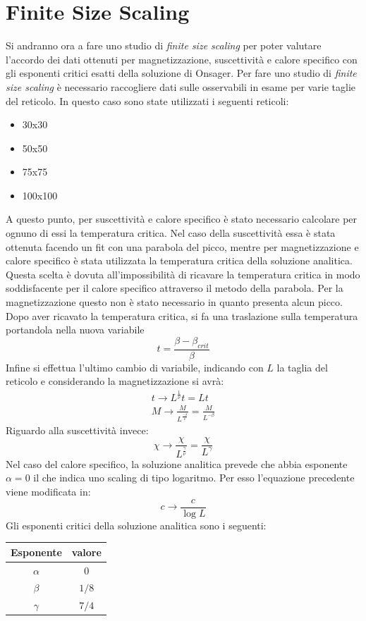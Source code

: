\section{Finite Size Scaling}
Si andranno ora a fare uno studio di \emph{finite size scaling} per poter valutare l'accordo dei dati ottenuti per magnetizzazione, suscettività e calore specifico con gli esponenti critici esatti della soluzione di Onsager.
Per fare uno studio di \emph{finite size scaling} è necessario raccogliere dati sulle osservabili in esame per varie taglie del reticolo. In questo caso sono state utilizzati i seguenti reticoli:
\begin{itemize}
\item 30x30 
\item 50x50 
\item 75x75 
\item 100x100 
\end{itemize}
A questo punto, per suscettività e calore specifico è stato necessario calcolare per ognuno di essi la temperatura critica.
Nel caso della suscettività essa è stata ottenuta facendo un fit con una parabola del picco, mentre per magnetizzazione e calore specifico è stata utilizzata la temperatura critica della soluzione analitica.
Questa scelta è dovuta all'impossibilità di ricavare la temperatura critica in modo soddisfacente per il calore specifico attraverso il metodo della parabola.
Per la magnetizzazione questo non è stato necessario in quanto presenta alcun picco.\\
Dopo aver ricavato la temperatura critica, si fa una traslazione sulla temperatura portandola nella nuova variabile 
$$
	 t = \frac{\beta - \beta_{crit}}{\beta}
$$ 
Infine si effettua l'ultimo cambio di variabile, indicando con $L$ la taglia del reticolo e considerando la magnetizzazione si avrà:
\begin{align}
	t \longrightarrow L^{\frac{1}{\nu}} t = L t \\
	M \longrightarrow \frac{M}{L^{\frac{-\beta}{\nu}}} = \frac{M}{L^{-\beta}}
\end{align}
Riguardo alla suscettività invece:
$$
	\chi \longrightarrow \frac{\chi}{L^{\frac{\gamma}{\nu}}} = \frac{\chi}{L^{\gamma}}
$$
Nel caso del calore specifico, la soluzione analitica prevede che abbia esponente $\alpha=0$ il che indica uno scaling di tipo logaritmo. Per esso l'equazione precedente viene modificata in:
$$
	c \longrightarrow \frac{c}{\log{L}}
$$
Gli esponenti critici della soluzione analitica sono i seguenti:
\begin{center}
	\begin{tabular}{|c|c|}
		\toprule
		Esponente & valore \\
		\midrule
		$\alpha$ & 0 \\
		$\beta$ & $1/8$\\
		$\gamma$ & $7/4$ \\
		\bottomrule
	\end{tabular}
\end{center}

